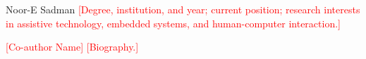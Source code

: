 \documentclass[journal]{IEEEtran}
\newcommand{\tbd}[1]{\textcolor{red}{[#1]}}
\begin{document}



\begin{IEEEbiographynophoto}{Noor-E Sadman}
\tbd{Degree, institution, and year; current position; research interests in assistive technology, embedded systems, and human-computer interaction.}
\end{IEEEbiographynophoto}

\begin{IEEEbiographynophoto}{\tbd{Co-author Name}}
\tbd{Biography.}
\end{IEEEbiographynophoto}
\end{document}
